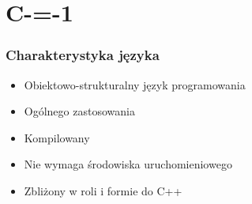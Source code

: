 \section{C-=-1}

\begin{frame}
	\frametitle{Charakterystyka języka}

	\begin{itemize}
		\item Obiektowo-strukturalny język programowania
		\item Ogólnego zastosowania
		\item Kompilowany
		\item Nie wymaga środowiska uruchomieniowego
		\item Zbliżony w roli i formie do C++
	\end{itemize}

\end{frame}


